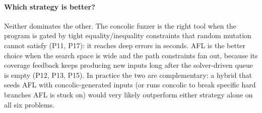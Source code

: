\paragraph{Which strategy is better?}
Neither dominates the other. The concolic fuzzer is the right tool when
the program is gated by tight equality/inequality constraints that
random mutation cannot satisfy (P11, P17): it reaches deep errors in
seconds. AFL is the better choice when the search space is wide and
the path constraints fan out, because its coverage feedback keeps
producing new inputs long after the solver-driven queue is empty (P12,
P13, P15). In practice the two are complementary: a hybrid that seeds
AFL with concolic-generated inputs (or runs concolic to break specific
hard branches AFL is stuck on) would very likely outperform either
strategy alone on all six problems.
